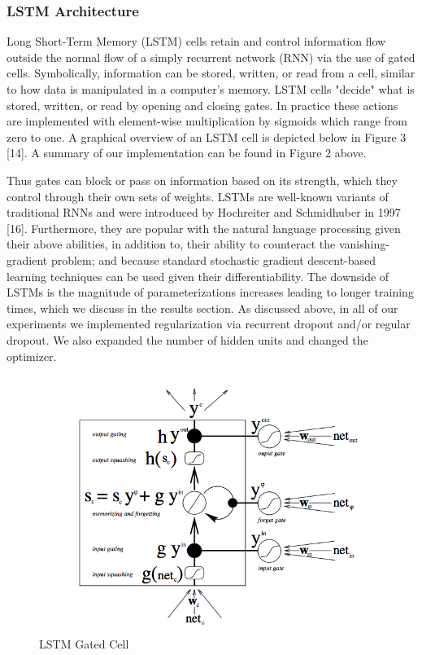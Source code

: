 \documentclass[10pt, twocolumn, letterpaper]{article}
\begin{document}
\subsubsection{LSTM Architecture}
Long Short-Term Memory (LSTM) cells retain and control information flow outside the normal flow of a simply recurrent network (RNN) via the use of gated cells. Symbolically, information can be stored, written, or read from a cell, similar to how data is manipulated in a computer’s memory. LSTM cells "decide" what is stored, written, or read by opening and closing gates. In practice these actions are implemented with element-wise multiplication by sigmoids which range from zero to one. A graphical overview of an LSTM cell is depicted below in Figure 3 [14]. A summary of our implementation can be found in Figure 2 above.

Thus gates can block or pass on information based on its strength, which they control through their own sets of weights. LSTMs are well-known variants of traditional RNNs and were introduced by Hochreiter and Schmidhuber in 1997 [16]. Furthermore, they are popular with the natural language processing given their above abilities, in addition to, their ability to counteract the vanishing-gradient problem; and because standard stochastic gradient descent-based learning techniques can be used given their differentiability. The downside of LSTMs is the magnitude of parameterizations increases leading to longer training times, which we discuss in the results section. As discussed above, in all of our experiments we implemented regularization via recurrent dropout and/or regular dropout. We also expanded the number of hidden units and changed the optimizer.

\begin{figure}[!ht]
\includegraphics[scale=0.38]{LSTM.png}
\caption{LSTM Gated Cell}
\end{figure}
\end{document}
